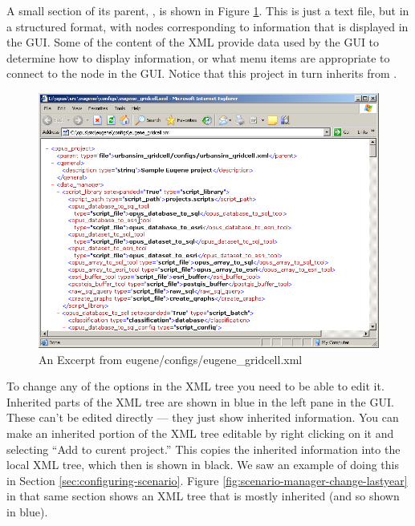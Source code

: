 A small section of its parent, ,
is shown in Figure \ref{fig:opus-xml}.  This is just a text file, but in a
structured format, with nodes corresponding to information that is
displayed in the GUI.  Some of the content of the XML provide data used by
the GUI to determine how to display information, or what menu items are
appropriate to connect to the node in the GUI.  Notice that this project in
turn inherits from .

\begin{figure}[htp]
\begin{center}
\includegraphics[scale=0.4]{graphics/opus-xml.png}
\end{center}
\caption{An Excerpt from eugene/configs/eugene\_gridcell.xml}
\label{fig:opus-xml}
\end{figure}

To change any of the options in the XML tree you need to be able to edit
it.  Inherited parts of the XML tree are shown in blue in the left pane in
the GUI\@.  These can't be edited directly --- they just show inherited
information.  You can make an inherited portion of the XML tree editable by
right clicking on it and selecting ``Add to curent project.''  This copies
the inherited information into the local XML tree, which then is shown in
black.  We saw an example of doing this in Section
\ref{sec:configuring-scenario}.  Figure
\ref{fig:scenario-manager-change-lastyear} in that same section shows an
XML tree that is mostly inherited (and so shown in blue).

